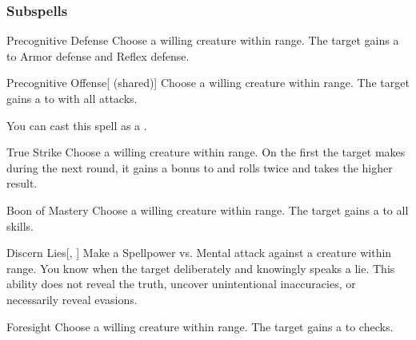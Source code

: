 \subsubsection{Subspells}


\begin{ability}[\nth{1}]{Precognitive Defense}
Choose a willing creature within \rngclose range.
The target gains a   to Armor defense and Reflex defense.
\end{ability}
\vspace{0.25em}


\begin{ability}[\nth{1}]{Precognitive Offense}[ (shared)]
Choose a willing creature within \rngclose range.
The target gains a   to  with all attacks.

You can cast this spell as a .
\end{ability}
\vspace{0.25em}


\begin{ability}[\nth{1}]{True Strike}
Choose a willing creature within \rngclose range.
On the first  the target makes during the next round, it gains a  bonus to  and rolls twice and takes the higher result.
\end{ability}
\vspace{0.25em}


\begin{ability}[\nth{2}]{Boon of Mastery}
Choose a willing creature within \rngclose range.
The target gains a   to all skills.
\end{ability}
\vspace{0.25em}


\begin{ability}[\nth{2}]{Discern Lies}[, ]
Make a Spellpower vs. Mental attack against a creature within \rngmed range.
\hit You know when the target deliberately and knowingly speaks a lie.
This ability does not reveal the truth, uncover unintentional inaccuracies, or necessarily reveal evasions.
\end{ability}
\vspace{0.25em}


\begin{ability}[\nth{2}]{Foresight}
Choose a willing creature within \rngclose range.
The target gains a   to  checks.
\end{ability}
\vspace{0.25em}


